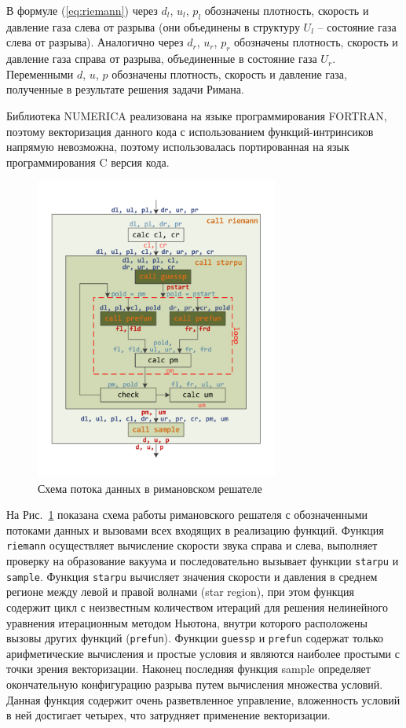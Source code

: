 \documentclass[utf8]{psta}
\begin{document}
В формуле (\ref{eq:riemann}) через $d_l$, $u_l$, $p_l$ обозначены плотность, скорость и давление газа слева от разрыва (они объединены в структуру  $U_l$ -- состояние газа слева от разрыва).
Аналогично через $d_r$, $u_r$, $p_r$ обозначены плотность, скорость и давление газа справа от разрыва, объединенные в состояние газа $U_r$.
Переменными $d$, $u$, $p$ обозначены плотность, скорость и давление газа, полученные в результате решения задачи Римана.

Библиотека NUMERICA реализована на языке программирования FORTRAN, поэтому векторизация данного кода с использованием функций-интринсиков напрямую невозможна, поэтому использовалась портированная на язык программирования C версия кода.

\begin{figure}
\includegraphics[width=8cm]{pics/pic_functions}
\caption{Схема потока данных в римановском решателе}
\label{pic:functions}
\end{figure}

На Рис.~\ref{pic:functions} показана схема работы римановского решателя с обозначенными потоками данных и вызовами всех входящих в реализацию функций. Функция \texttt{riemann} осуществляет вычисление скорости звука справа и слева, выполняет проверку на образование вакуума и последовательно вызывает функции \texttt{starpu} и \texttt{sample}.
Функция \texttt{starpu} вычисляет значения скорости и давления в среднем регионе между левой и правой волнами (star region), при этом функция содержит цикл с неизвестным количеством итераций для решения нелинейного уравнения итерационным методом Ньютона, внутри которого расположены вызовы других функций (\texttt{prefun}).
Функции \texttt{guessp} и \texttt{prefun} содержат только арифметические вычисления и простые условия и являются наиболее простыми с точки зрения векторизации.
Наконец последняя функция sample определяет окончательную конфигурацию разрыва путем вычисления множества условий.
Данная функция содержит очень разветвленное управление, вложенность условий в ней достигает четырех, что затрудняет применение векторизации.
\end{document}
